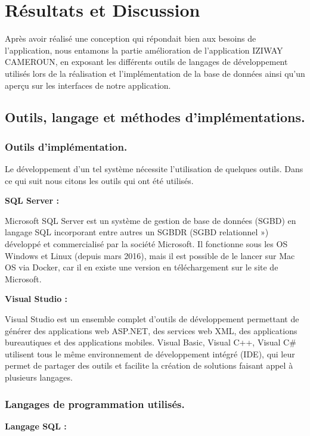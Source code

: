 \chapter{Résultats et Discussion}     %
\thispagestyle{fancy}
Après avoir réalisé une conception qui répondait bien aux besoins de l’application, nous entamons la partie amélioration de l’application IZIWAY CAMEROUN, en exposant les différents outils de langages de développement utilisés lors de la réalisation et l’implémentation de la base de données ainsi qu’un aperçu sur les interfaces de notre application.

\section{Outils, langage et méthodes d’implémentations.}

\subsection{Outils d'implémentation.}

Le développement d’un tel système nécessite l’utilisation de quelques outils. Dans ce qui suit nous citons les outils qui ont été utilisés.

\textbf{SQL Server  :} 

Microsoft SQL Server est un système de gestion de base de données (SGBD) en langage SQL incorporant entre autres un SGBDR (SGBD relationnel ») développé et commercialisé par la société Microsoft. Il fonctionne sous les OS Windows et Linux (depuis mars 2016), mais il est possible de le lancer sur Mac OS via Docker, car il en existe une version en téléchargement sur le site de Microsoft.

\textbf{Visual Studio   :} 

Visual Studio est un ensemble complet d'outils de développement permettant de générer des applications web ASP.NET, des services web XML, des applications bureautiques et des applications mobiles. Visual Basic, Visual C++, Visual C\# utilisent tous le même environnement de développement intégré (IDE), qui leur permet de partager des outils et facilite la création de solutions faisant appel à plusieurs langages.

\subsection{Langages de programmation utilisés.}

\textbf{Langage SQL   :} 

